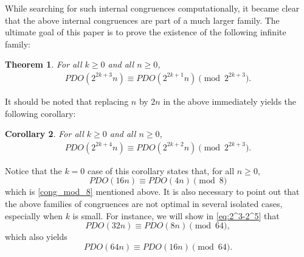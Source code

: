 \documentclass[12pt,reqno]{amsart}
\numberwithin{equation}{section}
\theoremstyle{theorem}
\newtheorem{theorem}{Theorem}
\newtheorem{corollary}[theorem]{Corollary}
\theoremstyle{definition}
\begin{document}
While searching for such internal congruences computationally, it became clear that the above internal congruences are part of a much larger family.  The ultimate goal of this paper is to prove the existence of the following infinite family:    

\begin{theorem}
\label{mainthm}
For all $k\geq 0$ and all $n\geq 0$, 
\begin{align}%
    PDO(2^{2k+3}n) \equiv PDO(2^{2k+1}n) \pmod{2^{2k+3}}.
\end{align}
\end{theorem}

It should be noted that replacing $n$ by $2n$ in the above immediately yields the following corollary:  

\begin{corollary}
 For all $k\geq 0$ and all $n\geq 0$, 
 \begin{align}%
     PDO(2^{2k+4}n) \equiv PDO(2^{2k+2}n) \pmod{2^{2k+3}}.
 \end{align}
\end{corollary}

Notice that the $k=0$ case of this corollary states that, for all $n\geq 0$, 
$$
PDO(16n) \equiv PDO(4n) \pmod{8}
$$
which is \eqref{cong_mod_8} mentioned above. It is also necessary to point out that the above families of congruences are not optimal in several isolated cases, especially when $k$ is small. For instance, we will show in \eqref{eq:2^3-2^5} that
$$
PDO(32n) \equiv PDO(8n) \pmod{64},
$$
which also yields
$$
PDO(64n) \equiv PDO(16n) \pmod{64}.
$$
\end{document}
